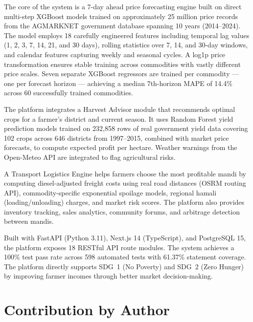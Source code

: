 \documentclass[12pt,a4paper]{report}
\begin{document}
The core of the system is a 7-day ahead price forecasting engine built on direct multi-step
XGBoost models trained on approximately 25 million price records from the AGMARKNET
government database spanning 10 years (2014--2024). The model employs 18 carefully
engineered features including temporal lag values (1, 2, 3, 7, 14, 21, and 30 days),
rolling statistics over 7, 14, and 30-day windows, and calendar features capturing
weekly and seasonal cycles. A log1p price transformation ensures stable training across
commodities with vastly different price scales. Seven separate XGBoost regressors are
trained per commodity --- one per forecast horizon --- achieving a median 7th-horizon
MAPE of 14.4\% across 60 successfully trained commodities.

The platform integrates a Harvest Advisor module that recommends optimal crops for a
farmer's district and current season. It uses Random Forest yield prediction models
trained on 232,858 rows of real government yield data covering 102 crops across 646
districts from 1997--2015, combined with market price forecasts, to compute expected
profit per hectare. Weather warnings from the Open-Meteo API are integrated to flag
agricultural risks.

A Transport Logistics Engine helps farmers choose the most profitable mandi by computing
diesel-adjusted freight costs using real road distances (OSRM routing API), commodity-specific
exponential spoilage models, regional hamali (loading/unloading) charges, and market risk
scores. The platform also provides inventory tracking, sales analytics, community forums,
and arbitrage detection between mandis.

Built with FastAPI (Python 3.11), Next.js 14 (TypeScript), and PostgreSQL 15, the platform
exposes 18 RESTful API route modules. The system achieves a 100\% test pass rate across
598 automated tests with 61.37\% statement coverage. The platform directly supports
SDG~1 (No Poverty) and SDG~2 (Zero Hunger) by improving farmer incomes through
better market decision-making.

\newpage
\thispagestyle{empty}
\chapter*{Contribution by Author}
\end{document}
